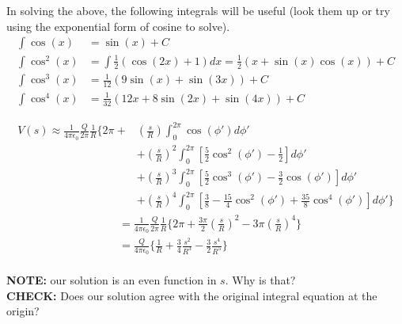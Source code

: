 \documentclass[a4paper, 11pt]{article}
\newenvironment{solution}{%
	\begin{list}{}{%
			\setlength{\topsep}{0pt}%
			\setlength{\leftmargin}{0.5cm}%
			\setlength{\rightmargin}{0.5cm}%
			\setlength{\listparindent}{\parindent}%
			\setlength{\itemindent}{\parindent}%
			\setlength{\parsep}{\parskip}%
		}%
		\item[]}{\end{list}}
\begin{document}
\begin{solution}
  \noindent In solving the above, the following integrals will be useful (look
  them up or try using the exponential form of cosine to solve).
  \begin{align}
    \int \cos(x) &= \sin(x)+C\\
    \int \cos^2(x) &= \int \frac{1}{2}(\cos(2x)+1)dx = \frac{1}{2}(x+\sin(x)\cos(x))+ C\\
    \int \cos^3(x) &= \frac{1}{12}(9\sin(x)+\sin(3x))+C\\
    \int \cos^4(x) &= \frac{1}{32}(12x+8\sin(2x)+\sin(4x)) + C
  \end{align}
  
  \begin{equation}
    \begin{split}
      V(s)\approx\frac{1}{4\pi\epsilon_0}\frac{Q}{2\pi}\frac{1}{R}\Bigg\{ 2\pi + &\left( \frac{s}{R} \right)\int_0^{2\pi}\cos(\phi')d\phi'\\
      &+ \left( \frac{s}{R} \right)^2\int_0^{2\pi}\left[ \frac{5}{2}\cos^2(\phi')-\frac{1}{2}  \right]d\phi'\\
      &+ \left( \frac{s}{R} \right)^3 \int_0^{2\pi}\left[ \frac{5}{2}\cos^3(\phi')-\frac{3}{2}\cos(\phi')    \right]d\phi'\\
      &+ \left( \frac{s}{R} \right)^4\int_0^{2\pi}\left[ \frac{3}{8}-\frac{15}{4}\cos^2(\phi')+\frac{35}{8}\cos^4(\phi') \right] d\phi' \Bigg\}
    \end{split}
  \end{equation}
  \begin{align}
    &= \frac{1}{4\pi\epsilon_0}\frac{Q}{2\pi}\frac{1}{R}\Bigg\{2\pi+ \frac{3\pi}{2}\left( \frac{s}{R} \right)^2 -3\pi\left( \frac{s}{R} \right)^4\Bigg\} \\
    &= \frac{Q}{4\pi\epsilon_0}\Bigg\{ \frac{1}{R}+\frac{3}{4} \frac{s^2}{R^3} -\frac{3}{2} \frac{s^4}{R^5}\Bigg\} \\
  \end{align}

  \noindent\textbf{NOTE:} our solution is an even function in $s$. Why is that? \\

  \noindent\textbf{CHECK:} Does our solution agree with the original integral equation at
  the origin? 
  
\end{solution}
\end{document}
